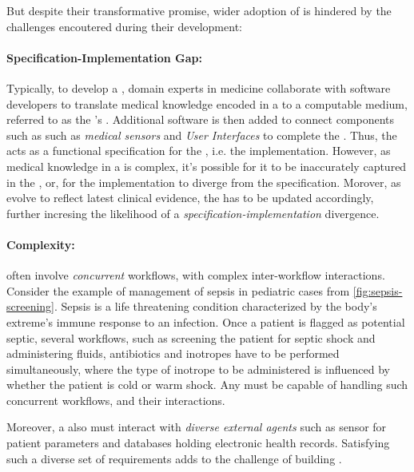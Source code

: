But despite their transformative promise, wider adoption
of \CDSSs{} is hindered by the challenges encoutered during their development:

\paragraph{Specification-Implementation Gap:} Typically, to develop
a \CDSS{}, domain experts in medicine collaborate with software developers
to translate medical knowledge encoded in a \BPG{} to a computable medium,
referred to as the \CDSSs{}'s \BPGLogic. Additional software is then
added to connect components such as such as
\emph{medical sensors} and \emph{User Interfaces} to complete the
\CDSS{}. Thus, the \BPG{} acts as a functional specification for the \BPGLogic, i.e. the
implementation. However, as medical knowledge in a \BPG{} is complex,
it's possible for it to be inaccurately captured in the \BPGLogic{}, or,
for the implementation to diverge from the specification. Morover,
as \BPGs{} evolve to reflect latest clinical evidence, the \BPGLogic{} has
to be updated accordingly, further incresing the likelihood of a
\emph{specification-implementation} divergence.

\paragraph{Complexity:} \BPGs{} often involve \emph{concurrent} workflows,
with complex inter-workflow interactions. Consider the example of management
of sepsis in pediatric cases from \figurename{} \ref{fig:sepsis-screening}.
Sepsis is a life threatening condition characterized by the body's
extreme's immune response to an infection. Once a patient is flagged as
potential septic, several workflows, such as screening the patient for septic shock
and administering fluids, antibiotics and
inotropes have to be performed simultaneously, where the type of inotrope
to be administered is influenced by whether the patient is cold or warm shock.
Any \CDSS{} must be capable of handling such concurrent workflows, and their
interactions.

Moreover, a \CDSS{} also must interact with \emph{diverse external agents}
such as sensor for patient parameters  and databases holding electronic health
records. Satisfying such a diverse set of requirements adds to the challenge of
building \CDSSs{}.

